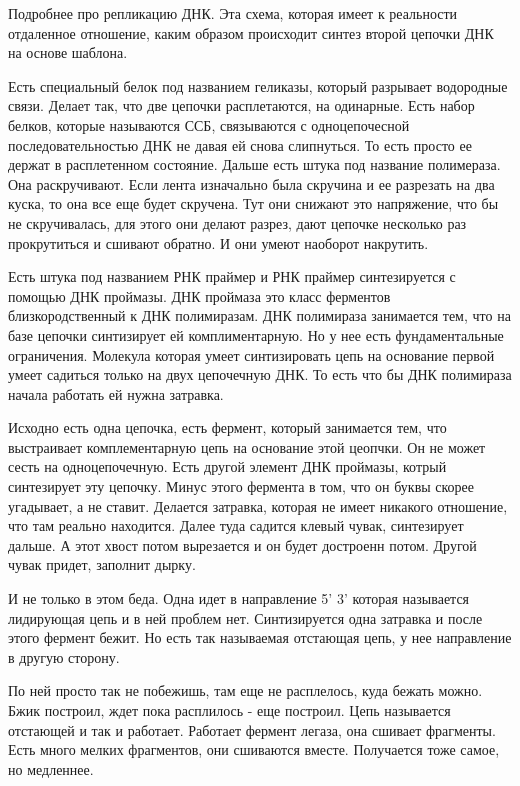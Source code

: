 Подробнее про репликацию ДНК. Эта схема, которая имеет к реальности 
отдаленное отношение, каким образом происходит синтез второй цепочки ДНК на 
основе шаблона. 

Есть специальный белок под названием геликазы, который разрывает водородные связи. 
Делает так, что две цепочки расплетаются, на одинарные. Есть набор 
белков, которые называются ССБ, связываются с одноцепочесной последовательностью ДНК
не давая ей снова слипнуться. То есть просто ее держат в расплетенном состояние. 
Дальше есть штука под название полимераза.  Она раскручивают. Если лента изначально была 
скручина и ее разрезать на два куска, то она все еще будет скручена. Тут они снижают это 
напряжение, что бы не скручивалась, для этого они делают разрез, дают 
цепочке несколько раз прокрутиться и сшивают обратно. И они 
умеют наоборот накрутить. 

Есть штука под названием РНК праймер и РНК праймер синтезируется с помощью
ДНК проймазы. ДНК проймаза это класс ферментов близкородственный к ДНК 
полимиразам. ДНК полимираза занимается тем, что на базе 
цепочки синтизирует ей комплиментарную. Но у нее есть фундаментальные ограничения. 
Молекула которая умеет синтизировать цепь на основание первой умеет садиться 
только на двух цепочечную ДНК. То есть что бы ДНК полимираза начала работать 
ей нужна затравка. 

Исходно есть одна цепочка, есть фермент, который занимается тем, что выстраивает 
комплементарную цепь на основание этой цеопчки. Он не может 
сесть на одноцепочечную. Есть другой элемент ДНК проймазы, котрый 
синтезирует эту цепочку. Минус этого 
фермента в том, что он буквы скорее угадывает, а не ставит. Делается 
затравка, которая не имеет никакого отношение, что там реально находится. 
Далее туда садится клевый чувак, синтезирует дальше. А этот хвост потом вырезается и он 
будет достроенн потом. Другой чувак придет, заполнит дырку. 

И не только в этом беда. Одна идет в направление 5' 3' которая называется лидирующая цепь и 
в ней проблем нет. Синтизируется одна затравка и после этого 
фермент бежит. Но есть так называемая отстающая цепь, у нее направление в другую сторону. 

По ней просто так не побежишь, там еще не расплелось, куда бежать можно. Бжик построил, 
ждет пока расплилось - еще построил. Цепь называется отстающей и так и работает. 
Работает фермент легаза, она сшивает фрагменты. Есть много мелких фрагментов, они 
сшиваются вместе. Получается тоже самое, но медленнее. 

